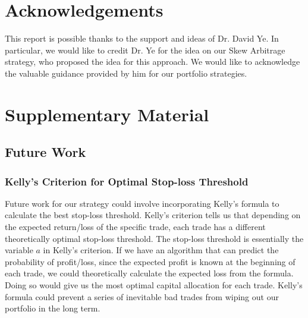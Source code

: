 \documentclass[10pt]{article}
\theoremstyle{definition}
\begin{document}
\section*{Acknowledgements}
This report is possible thanks to the support and ideas of Dr. David Ye. In particular, we would like to credit Dr. Ye for the idea on our Skew Arbitrage strategy, who proposed the idea for this approach. We would like to acknowledge the valuable guidance provided by him for our portfolio strategies.


 




\section*{Supplementary Material}
\subsection*{Future Work}
\subsubsection*{Kelly's Criterion for Optimal Stop-loss Threshold}
Future work for our strategy could involve incorporating Kelly's formula to calculate the best stop-loss threshold. Kelly's criterion tells us that depending on the expected return/loss of the specific trade, each trade has a different theoretically optimal stop-loss threshold. The stop-loss threshold is essentially the variable $a$ in Kelly's criterion. If we have an algorithm that can predict the probability of profit/loss, since the expected profit is known at the beginning of each trade, we could theoretically calculate the expected loss from the formula. Doing so would give us the most optimal capital allocation for each trade. Kelly's formula could prevent a series of inevitable bad trades from wiping out our portfolio in the long term. 
\end{document}
